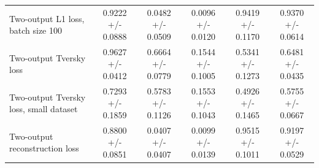 \begin{tabular}{lccccc}
Two-output L1 loss, batch size 100 & 0.9222 +/- 0.0888 & 0.0482 +/- 0.0509 & 0.0096 +/- 0.0120 & 0.9419 +/- 0.1170 & 0.9370 +/- 0.0614 \\
Two-output Tversky loss & 0.9627 +/- 0.0412 & 0.6664 +/- 0.0779 & 0.1544 +/- 0.1005 & 0.5341 +/- 0.1273 & 0.6481 +/- 0.0435 \\
Two-output Tversky loss, small dataset & 0.7293 +/- 0.1859 & 0.5783 +/- 0.1126 & 0.1553 +/- 0.1043 & 0.4926 +/- 0.1465 & 0.5755 +/- 0.0667 \\
Two-output reconstruction loss & 0.8800 +/- 0.0851 & 0.0407 +/- 0.0407 & 0.0099 +/- 0.0139 & 0.9515 +/- 0.1011 & 0.9197 +/- 0.0529 \\
\bottomrule
\end{tabular}
